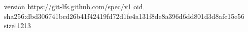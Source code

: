version https://git-lfs.github.com/spec/v1
oid sha256:dbd306741bcd26b41f42419fd72d1fe4a131f8de8a396d6dd801d3d8afc15e56
size 1213
